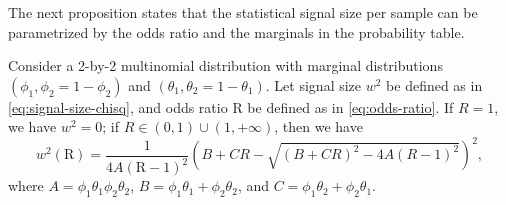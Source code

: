 The next proposition states that the statistical signal size per sample can be parametrized by the odds ratio and the marginals in the probability table.

\begin{proposition} \label{prop:signal-size-odds-ratio}
Consider a 2-by-2 multinomial distribution with marginal distributions $(\phi_1, \phi_2 = 1-\phi_2)$ and $(\theta_1, \theta_2=1-\theta_1)$.
Let signal size $w^2$ be defined as in \eqref{eq:signal-size-chisq}, and odds ratio $\text{R}$ be defined as in \eqref{eq:odds-ratio}. 
If $R=1$, we have $w^2 = 0$; if $R\in(0,1)\cup(1,+\infty)$, then we have
\begin{equation} \label{eq:signal-size-odds-ratio}
    w^2(\text{R}) =
    \frac{1}{4A(\text{R}-1)^2}\left(B+CR-\sqrt{(B+CR)^2-4A(R-1)^2}\right)^2,
\end{equation}
where $A = \phi_1\theta_1\phi_2\theta_2$, $B = \phi_1\theta_1+\phi_2\theta_2$, and $C = \phi_1\theta_2+\phi_2\theta_1$.
\end{proposition}

